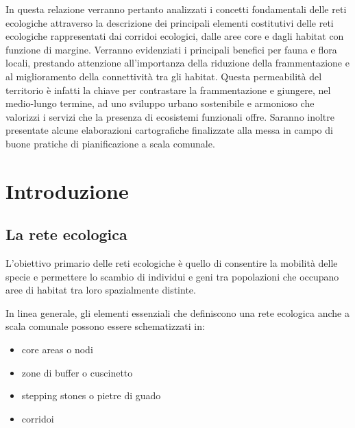 \documentclass[
]{book}
\providecommand{\tightlist}{%
  \setlength{\itemsep}{0pt}\setlength{\parskip}{0pt}}
\begin{document}
In questa relazione verranno pertanto analizzati i concetti fondamentali delle reti ecologiche attraverso la descrizione dei principali elementi costitutivi delle reti ecologiche rappresentati dai corridoi ecologici, dalle aree core e dagli habitat con funzione di margine. Verranno evidenziati i principali benefici per fauna e flora locali, prestando attenzione all'importanza della riduzione della frammentazione e al miglioramento della connettività tra gli habitat. Questa permeabilità del territorio è infatti la chiave per contrastare la frammentazione e giungere, nel medio-lungo termine, ad uno sviluppo urbano sostenibile e armonioso che valorizzi i servizi che la presenza di ecosistemi funzionali offre. Saranno inoltre presentate alcune elaborazioni cartografiche finalizzate alla messa in campo di buone pratiche di pianificazione a scala comunale.

\chapter{Introduzione}\label{introduzione}

\section{La rete ecologica}\label{la-rete-ecologica}

L'obiettivo primario delle reti ecologiche è quello di consentire la
mobilità delle specie e permettere lo scambio di individui e geni tra
popolazioni che occupano aree di habitat tra loro spazialmente distinte.

In linea generale, gli elementi essenziali che definiscono una rete
ecologica anche a scala comunale possono essere schematizzati in:

\begin{itemize}
\tightlist
\item
  core areas o nodi
\item
  zone di buffer o cuscinetto
\item
  stepping stones o pietre di guado
\item
  corridoi
\end{itemize}
\end{document}
